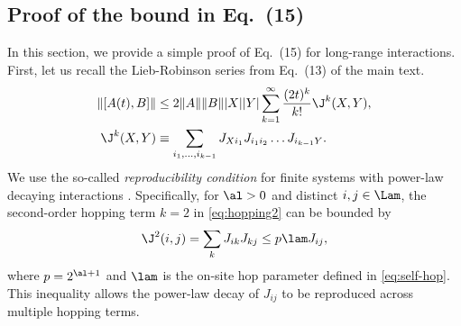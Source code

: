 \subsection{Proof of the bound in Eq.~(15)}
\label{sec:newbound}

In this section, we provide a simple proof of Eq.~(15) for long-range interactions.
First, let us recall the Lieb-Robinson series from Eq.~(13) of the main text.
\begin{align}
	\label{eq:HKseries2}
		\|[A(t),B]\| &\le 2\|A\|\|B\||X||Y|\sum_{k=1}^{\infty}\frac{(2t)^{k}}{k!} \J^k(X,Y), \\
	\label{eq:hopping2}
	\J^k(X,Y) &\equiv \sum_{i_{1},\dots,i_{k-1}}J_{Xi_{1}}J_{i_{1}i_{2}}\dots J_{i_{k-1}Y}.
\end{align}
We use the so-called \emph{reproducibility condition} for finite systems with power-law decaying interactions \cite{HK, Gong14}. Specifically, for $\al > 0$ and distinct $i,j\in \Lam$, the second-order hopping term $k=2$ in \cref{eq:hopping2} can be bounded by
\begin{equation}
	\label{eq:repcon}
	\J^2(i,j) = \sum_k J_{ik}J_{kj} \le p\lam J_{ij},
\end{equation}
where $p=2^{\al+1}$ and $\lam$ is the on-site hop parameter defined in \cref{eq:self-hop}.
This inequality allows the power-law decay of $J_{ij}$ to be reproduced across multiple hopping terms.

